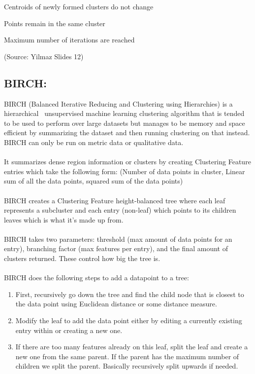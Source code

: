\documentclass{aa}
\begin{document}
 Centroids of newly formed clusters do not change

 Points remain in the same cluster

 Maximum number of iterations are reached

(Source: Yilmaz Slides 12)

\subsection{\textbf{BIRCH:}}
BIRCH (Balanced Iterative Reducing and Clustering using Hierarchies) is a hierarchical  unsupervised machine learning clustering algorithm that is tended to be used to perform over large datasets but manages to be memory and space efficient by summarizing the dataset and then running clustering on that instead. BIRCH can only be run on metric data or qualitative data. 
\\\\
It summarizes dense region information or clusters by creating Clustering Feature entries which take the following form: (Number of data points in cluster, Linear sum of all the data points, squared sum of the data points)
\\\\
BIRCH creates a Clustering Feature height-balanced tree where each leaf represents a subcluster and each entry (non-leaf) which points to its children leaves which is what it’s made up from.
\\\\
BIRCH takes two parameters: threshold (max amount of data points for an entry), branching factor (max features per entry), and the final amount of clusters returned. These control how big the tree is.
\\\\
BIRCH does the following steps to add a datapoint to a tree:

\begin{enumerate}
    \item First, recursively go down the tree and find the child node that is closest to the data point using Euclidean distance or some distance measure.
    \item Modify the leaf to add the data point either by editing a currently existing entry within or creating a new one.
    \item If there are too many features already on this leaf, split the leaf and create a new one from the same parent. If the parent has the maximum number of children we split the parent. Basically recursively split upwards if needed.
\end{enumerate}
\end{document}
